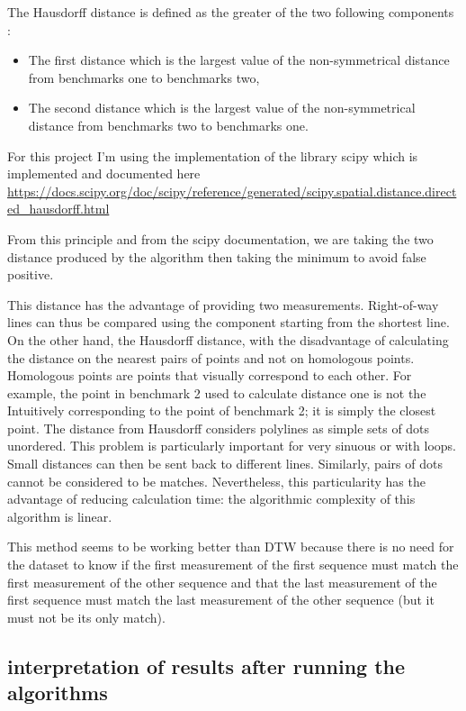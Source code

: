 \documentclass{article}
\begin{document}
The Hausdorff distance is defined as the greater of the two following components :

\begin{itemize}
    \item The first distance which is the largest value of the non-symmetrical distance from benchmarks one to benchmarks two,
    \item The second distance which is the largest value of the non-symmetrical distance from benchmarks two to benchmarks one.
\end{itemize}


For this project I'm using the implementation of the library scipy which is implemented and documented here \url{https://docs.scipy.org/doc/scipy/reference/generated/scipy.spatial.distance.directed_hausdorff.html}

From this principle and from the scipy documentation, we are taking the two distance produced by the algorithm then taking the minimum to avoid false positive.

This distance has the advantage of providing two measurements. Right-of-way lines can thus be compared using the component starting from the shortest line. On the other hand, the Hausdorff distance, with the disadvantage of calculating the
distance on the nearest pairs of points and not on homologous points. Homologous points are points that visually correspond to each other. For example, the point in benchmark 2 used to calculate distance one is not the Intuitively corresponding to the point of benchmark 2; it is simply the closest point. The distance from Hausdorff considers polylines as simple sets of dots unordered. This problem is particularly important for very sinuous or with loops. Small distances can then be sent back to different lines. Similarly, pairs of dots cannot be considered to be matches. Nevertheless, this particularity has the advantage of reducing calculation time: the algorithmic complexity of this algorithm is linear. 


This method seems to be working better than DTW because there is no need for the dataset to know if the first measurement of the first sequence must match the first measurement of the other sequence and that the last measurement of the first sequence must match the last measurement of the other sequence (but it must not be its only match).



\subsection{ interpretation of results after running the algorithms}
\end{document}
